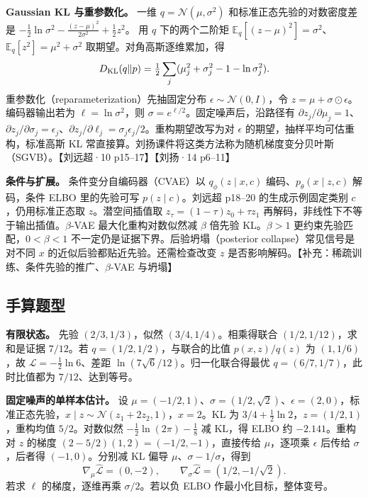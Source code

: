 \documentclass[UTF8,a4paper,zihao=-4,fontset=fandol]{ctexart}
\begin{document}
\textbf{Gaussian KL 与重参数化。} 一维 $q=\mathcal N(\mu,\sigma^2)$ 和标准正态先验的对数密度差是
$-\tfrac12\ln\sigma^2-\tfrac{(z-\mu)^2}{2\sigma^2}+\tfrac12z^2$。
用 $q$ 下的两个二阶矩 $\mathbb E_q[(z-\mu)^2]=\sigma^2$、
$\mathbb E_q[z^2]=\mu^2+\sigma^2$ 取期望。对角高斯逐维累加，得
\[
 D_{\rm KL}(q\|p)=\tfrac12\sum_j
       (\mu_j^2+\sigma_j^2-1-\ln\sigma_j^2).
\]
重参数化（reparameterization）先抽固定分布 $\epsilon\sim\mathcal N(0,I)$，令 $z=\mu+\sigma\odot\epsilon$。编码器输出若为 $\ell=\ln\sigma^2$，则 $\sigma=e^{\ell/2}$。固定噪声后，沿路径有 $\partial z_j/\partial\mu_j=1$、$\partial z_j/\partial\sigma_j=\epsilon_j$、$\partial z_j/\partial\ell_j=\sigma_j\epsilon_j/2$。重构期望改写为对 $\epsilon$ 的期望，抽样平均可估重构，标准高斯 KL 常直接算。刘扬课件将这类方法称为随机梯度变分贝叶斯（SGVB）。【刘远超·10 p15--17】【刘扬·14 p6--11】

\textbf{条件与扩展。} 条件变分自编码器（CVAE）以 $q_\phi(z\mid x,c)$ 编码、$p_\theta(x\mid z,c)$ 解码，条件 ELBO 里的先验可写 $p(z\mid c)$。刘远超 p18--20 的生成示例固定类别 $c$，仍用标准正态取 $z$。潜空间插值取 $z_\tau=(1-\tau)z_0+\tau z_1$ 再解码，非线性下不等于输出插值。$\beta$-VAE 最大化重构对数似然减 $\beta$ 倍先验 KL。$\beta>1$ 更约束先验匹配，$0<\beta<1$ 不一定仍是证据下界。后验坍塌（posterior collapse）常见信号是对不同 $x$ 的近似后验都贴近先验。还需检查改变 $z$ 是否影响解码。【补充：稀疏训练、条件先验的推广、$\beta$-VAE 与坍塌】

\subsection{手算题型}

\textbf{有限状态。} 先验 $(2/3,1/3)$，似然 $(3/4,1/4)$。相乘得联合 $(1/2,1/12)$，求和是证据 $7/12$。若 $q=(1/2,1/2)$，与联合的比值 $p(x,z)/q(z)$ 为 $(1,1/6)$，故 $\mathcal L=-\tfrac12\ln6$、差距 $\ln(7\sqrt6/12)$。归一化联合得最优 $q=(6/7,1/7)$，此时比值都为 $7/12$、达到等号。

\textbf{固定噪声的单样本估计。} 设 $\mu=(-1/2,1)$、$\sigma=(1/2,\sqrt2)$、$\epsilon=(2,0)$，标准正态先验，$x\mid z\sim\mathcal N(z_1+2z_2,1)$，$x=2$。KL 为 $3/4+\tfrac12\ln2$，$z=(1/2,1)$，重构均值 $5/2$。对数似然 $-\tfrac12\ln(2\pi)-\tfrac18$ 减 KL，得 ELBO 约 $-2.141$。重构对 $z$ 的梯度 $(2-5/2)(1,2)=(-1/2,-1)$，直接传给 $\mu$，逐项乘 $\epsilon$ 后传给 $\sigma$，后者得 $(-1,0)$。分别减 KL 偏导 $\mu$、$\sigma-1/\sigma$，得到
\[
 \nabla_\mu\widehat{\mathcal L}=(0,-2),\qquad
 \nabla_\sigma\widehat{\mathcal L}=(1/2,-1/\sqrt2).
\]
若求 $\ell$ 的梯度，逐维再乘 $\sigma/2$。若以负 ELBO 作最小化目标，整体变号。
\end{document}
